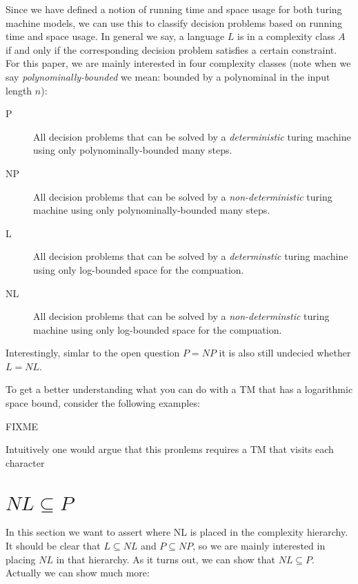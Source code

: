 Since we have defined a notion of running time and space usage for both
turing machine models, we can use this to classify decision problems
based on running time and space usage. In general we say, a language $L$
is in a complexity class $A$ if and only if the corresponding decision
problem satisfies a certain constraint. For this paper, we are mainly
interested in four complexity classes (note when we say
\emph{polynominally-bounded} we mean: bounded by a polynominal in the
input length $n$):

\begin{description}
\item[P]
All decision problems that can be solved by a \emph{deterministic}
turing machine using only polynominally-bounded many steps.
\item[NP]
All decision problems that can be solved by a \emph{non-deterministic}
turing machine using only polynominally-bounded many steps.
\item[L]
All decision problems that can be solved by a \emph{determinstic} turing
machine using only log-bounded space for the compuation.
\item[NL]
All decision problems that can be solved by a \emph{non-determinstic}
turing machine using only log-bounded space for the compuation.
\end{description}

Interestingly, simlar to the open question $P = NP$ it is also still
undecied whether $L = NL$.

To get a better understanding what you can do with a TM that has a
logarithmic space bound, consider the following examples:

FIXME

\begin{description}
\itemsep1pt\parskip0pt
\item[Writing down all occurences of a symbol in the input]
Intuitively one would argue that this pronlems requires a TM that visits
each character
\end{description}

\section{$NL \subseteq P$}\label{nl-subseteq-p}

In this section we want to assert where NL is placed in the complexity
hierarchy. It should be clear that $L \subseteq NL$ and
$P \subseteq NP$, so we are mainly interested in placing $NL$ in that
hierarchy. As it turns out, we can show that $NL \subseteq P$. Actually
we can show much more:

